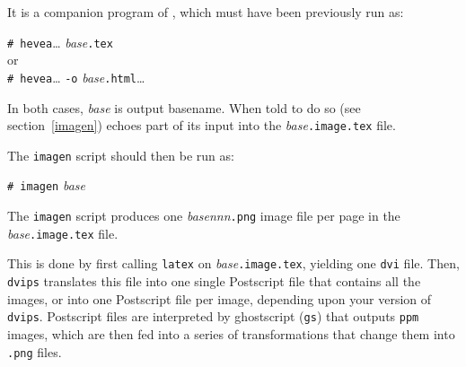 It is a companion program of \hevea{}, which must have been previously run as:
\begin{flushleft}
\texttt{\# hevea}\ldots{} \textit{base}\texttt{.tex}\\
or\\
\texttt{\# hevea}\ldots{} \texttt{-o} \textit{base}\texttt{.html}\ldots\\
\end{flushleft}
In both cases, \textit{base} is \hevea{} output basename.
When told to do so (see section~\ref{imagen})
\hevea{} echoes part of its input into
the \textit{base}\texttt{.image.tex} file.

The \texttt{imagen} script should then be run as:
\begin{flushleft}
\texttt{\# imagen} \textit{base}
\end{flushleft}
The \texttt{imagen} script produces
one \textit{base}\textsl{nnn}\texttt{.png} image file per page in the
\textit{base}\texttt{.image.tex} file.

This is done by first calling \texttt{latex} on
\textit{base}\texttt{.image.tex}, yielding one \texttt{dvi}
file.
Then, \texttt{dvips} translates this file into one single Postscript file that
contains all 
the images, or into one  Postscript file per image,
depending upon your version of \texttt{dvips}.
Postscript files are interpreted by ghostscript (\texttt{gs}) that
outputs \texttt{ppm} images, which are then fed into a series of
transformations that change them into \texttt{.png} files.

